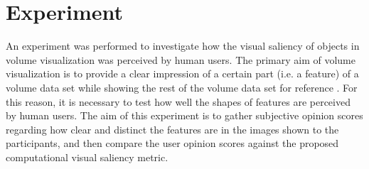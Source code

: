 \section{Experiment}

An experiment was performed to investigate how the visual saliency of objects in volume visualization was perceived by human users. The primary aim of volume visualization is to provide a clear impression of a certain part (i.e. a feature) of a volume data set while showing the rest of the volume data set for reference \cite{redmond_influencing_2010}.
For this reason, it is necessary to test how well the shapes of features are perceived by human users.
The aim of this experiment is to gather subjective opinion scores regarding how clear and distinct the features are in the images shown to the participants, and then compare the user opinion scores against the proposed computational visual saliency metric.


